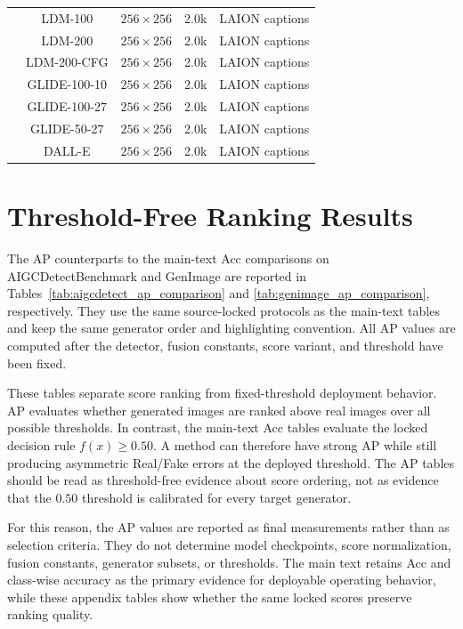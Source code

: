 \documentclass[letterpaper,journal]{IEEEtran}
\begin{document}
\begin{table}[!t]
\begin{tabular}{@{}c|cccc@{}}
& LDM-100 \cite{rombach2022ldm} & $256\times256$ & 2.0k & LAION captions \\
& LDM-200 & $256\times256$ & 2.0k & LAION captions \\
& LDM-200-CFG & $256\times256$ & 2.0k & LAION captions \\
& GLIDE-100-10 \cite{nichol2022glide} & $256\times256$ & 2.0k & LAION captions \\
& GLIDE-100-27 & $256\times256$ & 2.0k & LAION captions \\
& GLIDE-50-27 & $256\times256$ & 2.0k & LAION captions \\
& DALL-E \cite{ramesh2021dalle} & $256\times256$ & 2.0k & LAION captions \\
\bottomrule
\end{tabular}
\end{table}



\section{Threshold-Free Ranking Results}

The AP counterparts to the main-text Acc comparisons on AIGCDetectBenchmark and GenImage are reported in Tables~\ref{tab:aigcdetect_ap_comparison} and \ref{tab:genimage_ap_comparison}, respectively. They use the same source-locked protocols as the main-text tables and keep the same generator order and highlighting convention. All AP values are computed after the detector, fusion constants, score variant, and threshold have been fixed.

These tables separate score ranking from fixed-threshold deployment behavior. AP evaluates whether generated images are ranked above real images over all possible thresholds. In contrast, the main-text Acc tables evaluate the locked decision rule $f(x)\geq0.50$. A method can therefore have strong AP while still producing asymmetric Real/Fake errors at the deployed threshold. The AP tables should be read as threshold-free evidence about score ordering, not as evidence that the $0.50$ threshold is calibrated for every target generator.

For this reason, the AP values are reported as final measurements rather than as selection criteria. They do not determine model checkpoints, score normalization, fusion constants, generator subsets, or thresholds. The main text retains Acc and class-wise accuracy as the primary evidence for deployable operating behavior, while these appendix tables show whether the same locked scores preserve ranking quality.
\end{document}
